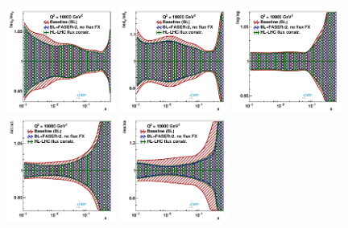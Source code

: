 \begin{figure}[t]
\centering
\includegraphics[width=0.32\textwidth]{plots/proton_fasernu2/FASERv2_flux_HL-LHC/fred05fcorr05_fluxR4_FASERv2_q2_10000_pdf_uv_ratio.pdf}
\includegraphics[width=0.32\textwidth]{plots/proton_fasernu2/FASERv2_flux_HL-LHC/fred05fcorr05_fluxR4_FASERv2_q2_10000_pdf_dv_ratio.pdf}
\includegraphics[width=0.32\textwidth]{plots/proton_fasernu2/FASERv2_flux_HL-LHC/fred05fcorr05_fluxR4_FASERv2_q2_10000_pdf_g_ratio.pdf}\\
\includegraphics[width=0.32\textwidth]{plots/proton_fasernu2/FASERv2_flux_HL-LHC/fred05fcorr05_fluxR4_FASERv2_q2_10000_pdf_Sea_ratio.pdf}
\includegraphics[width=0.32\textwidth]{plots/proton_fasernu2/FASERv2_flux_HL-LHC/fred05fcorr05_fluxR4_FASERv2_q2_10000_pdf_s_ratio.pdf}

\end{figure}
